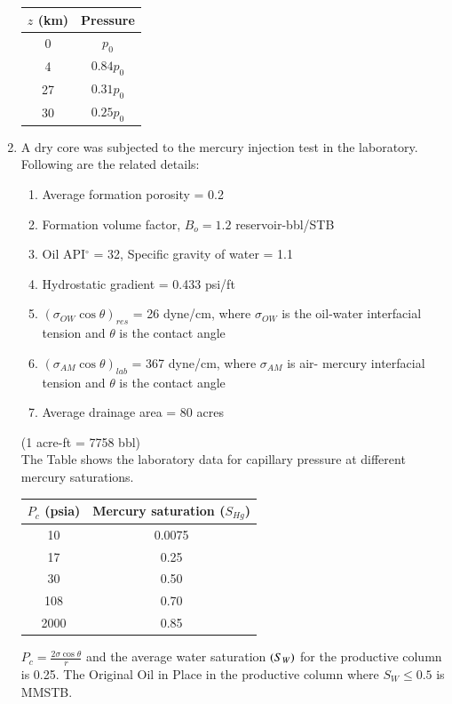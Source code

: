 \documentclass[journal,12pt,onecolumn]{IEEEtran}
\theoremstyle{remark}
\begin{document}
\begin{enumerate}
\hfill{}

\begin{tabular}{|c|c|}
\hline
$z$ (km) & Pressure \\
\hline
0 & $p_0$ \\
4 & $0.84p_0$ \\
27 & $0.31p_0$ \\
30 & $0.25p_0$ \\
\hline
\end{tabular}

\pagebreak

\item A dry core was subjected to the mercury injection test in the laboratory. Following are the related details:  

\begin{enumerate}
\item Average formation porosity = 0.2 
\item Formation volume factor, $B_o = 1.2$ reservoir-bbl/STB  
\item Oil API$^\circ$ = 32, Specific gravity of water = 1.1 
\item Hydrostatic gradient = 0.433 psi/ft  
\item $(\sigma_{OW} \cos \theta)_{res}$ = 26 dyne/cm, where $\sigma_{OW}$ is the oil-water interfacial tension and $\theta$ is the contact angle 
\item $(\sigma_{AM} \cos \theta)_{lab}$ = 367 dyne/cm, where $\sigma_{AM}$ is air- mercury interfacial tension and $\theta$ is the contact angle 
\item Average drainage area = 80 acres 
\end{enumerate}

(1 acre-ft = 7758 bbl) \\ 

The Table shows the laboratory data for capillary pressure at different mercury saturations.


\begin{tabular}{|c|c|}
\hline
$P_c$ (psia) & Mercury saturation ($S_{Hg}$) \\
\hline
10 & 0.0075 \\
17 & 0.25 \\
30 & 0.50 \\
108 & 0.70 \\
2000 & 0.85 \\
\hline
\end{tabular}


$P_c = \frac{2\sigma \cos \theta}{r}$ and the average water saturation $\left(S_W\right)$ for the productive column is 0.25. The Original Oil in Place  in the productive column where $S_W \leq 0.5$ is \underline{\hspace{2cm}} MMSTB.  


\end{enumerate}
\end{document}
